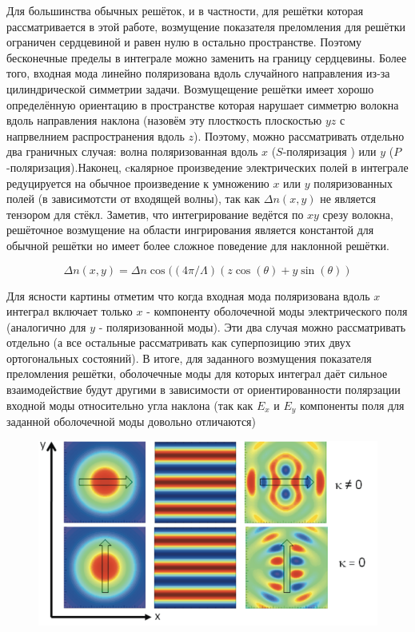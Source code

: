Для большинства обычных решёток, и в частности, для решётки которая рассматривается в этой работе, возмущение показателя преломления для решётки ограничен сердцевиной и равен нулю в остально пространстве. Поэтому бесконечные пределы в интеграле можно заменить на границу сердцевины.
Более того, входная мода линейно поляризована вдоль случайного направления
из-за цилиндрической симметрии задачи. Возмущещение решётки имеет хорошо определённую ориентацию в пространстве которая нарушает симметрю волокна вдоль направления наклона (назовём эту плосткость плоскостью $yz$  с напрвелнием распространения вдоль $ z $). Поэтому, можно рассматривать отдельно два граничных случая: волна поляризованная вдоль $ x $  ($ S $-поляризация ) или $ y $ ($ P $-поляризация).Наконец, cкалярное произведение электрических полей в интеграле редуцируется на обычное произведение к умножению $ x $ или $ y $ поляризованных полей (в зависимотсти от входящей волны), так как $\Delta n(x , y)$ не является тензором для стёкл. Заметив, что интегрирование ведётся по $ xy $ срезу волокна, решёточное возмущение на области ингрирования является константой для обычной решётки но имеет более сложное поведение для наклонной решётки.

$$\Delta n(x, y)=\Delta n \cos ((4 \pi / \Lambda)(z \cos (\theta)+y \sin (\theta))$$

Для ясности картины отметим что когда входная мода поляризована вдоль $ x $
интеграл включает только $ x $ - компоненту оболочечной моды электрического поля (аналогично для $ y $ - поляризованной моды). Эти два случая можно рассматривать отдельно (а все остальные рассматривать как суперпозицию этих двух ортогональных состояний). В итоге, для заданного возмущения показателя преломления решётки, оболочечные моды для которых интеграл даёт сильное взаимодействие будут другими в зависимости от ориентированности полярзации входной моды относительно угла наклона (так как $ E_x $ и $ E_y $ компоненты поля для заданной оболочечной моды довольно отличаются)
 
\begin{figure}[h]
	\centering
	\includegraphics[width=0.7\linewidth]{screenshot008}
	\caption{}
	\label{fig:screenshot008}
\end{figure}


